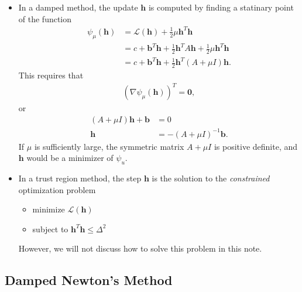 \documentclass[10pt]{article}
\newcommand{\ve}[1]{\mathbf{#1}}
\newcommand{\mcal}[1]{\mathcal{#1}}
\begin{document}
\begin{itemize}
    \item In a damped method, the update $\ve{h}$ is computed by finding a statinary point of the function
    \begin{align*}
        \psi_\mu(\ve{h}) 
        &= \mcal{L}(\ve{h}) + \frac{1}{2}\mu\ve{h}^T\ve{h} \\
        &= c + \ve{b}^T \ve{h} + \frac{1}{2} \ve{h}^T A \ve{h} + \frac{1}{2}\mu \ve{h}^T \ve{h} \\
        &= c + \ve{b}^T \ve{h} + \frac{1}{2} \ve{h}^T (A + \mu I) \ve{h}.
    \end{align*}
    This requires that
    \begin{align*}
        (\nabla \psi_\mu(\ve{h}))^T = \ve{0},        
    \end{align*}
    or
    \begin{align*}
        (A + \mu I)\ve{h} + \ve{b} &= 0 \\
        \ve{h} &= -(A + \mu I)^{-1} \ve{b}.
    \end{align*}
    If $\mu$ is sufficiently large, the symmetric matrix $A + \mu I$ is positive definite, and $\ve{h}$ would be a minimizer of $\psi_u$.

    \item In a trust region method, the step $\ve{h}$ is the solution to the \emph{constrained} optimization problem
    \begin{itemize}
        \item[] minimize $\mathcal{L}(\ve{h})$
        \item[] subject to $\ve{h}^T\ve{h} \leq \Delta^2$
    \end{itemize}
    However, we will not discuss how to solve this problem in this note.
\end{itemize}

\subsection{Damped Newton's Method}
\end{document}
